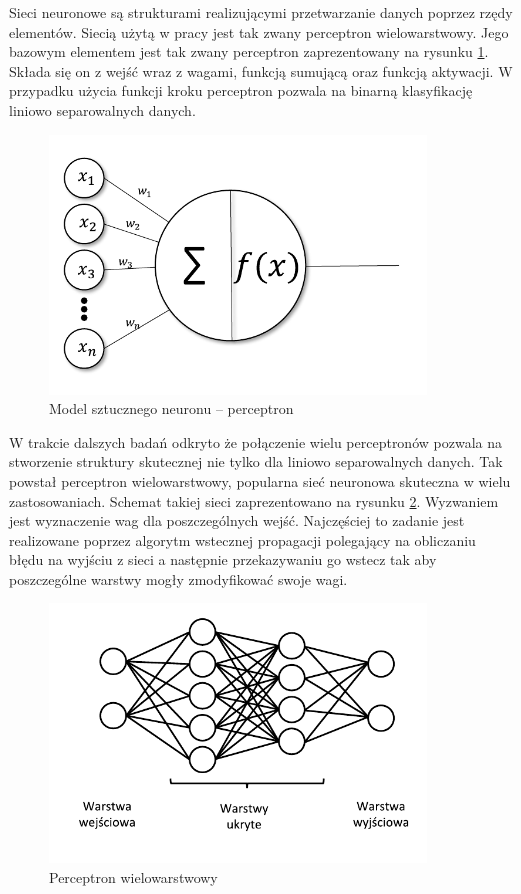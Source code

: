 \documentclass[inzynierska]{pwr_wmat_praca_dyplomowa}
\theoremstyle{plain}
\numberwithin{theorem}{chapter}
\theoremstyle{definition}
\numberwithin{theorem}{chapter}
\begin{document}
Sieci neuronowe są strukturami realizującymi przetwarzanie danych poprzez rzędy elementów. Siecią użytą w pracy jest tak zwany perceptron wielowarstwowy. Jego bazowym elementem jest tak zwany perceptron zaprezentowany na rysunku \ref{perceptron}. Składa się on z wejść wraz z wagami, funkcją sumującą oraz funkcją aktywacji. W przypadku użycia funkcji kroku perceptron pozwala na binarną klasyfikację liniowo separowalnych danych. 
\begin{figure}[ht]
	\centering
	\includegraphics[width=10cm]{images/perceptron_c.pdf}
	\caption{Model sztucznego neuronu -- perceptron}
	\label{perceptron}
\end{figure}
W trakcie dalszych badań odkryto że połączenie wielu perceptronów pozwala na stworzenie struktury skutecznej nie tylko dla liniowo separowalnych danych. Tak powstał perceptron wielowarstwowy, popularna sieć neuronowa skuteczna w wielu zastosowaniach. Schemat takiej sieci zaprezentowano na rysunku \ref{mlp}. Wyzwaniem jest wyznaczenie wag dla poszczególnych wejść. Najczęściej to zadanie jest realizowane poprzez algorytm wstecznej propagacji polegający na obliczaniu błędu na wyjściu z sieci a następnie przekazywaniu go wstecz tak aby poszczególne warstwy mogły zmodyfikować swoje wagi. 
\begin{figure}[ht]
	\centering
	\includegraphics[width=10cm]{images/siec_c.pdf}
	\caption{Perceptron wielowarstwowy}
	\label{mlp}
\end{figure}
\end{document}
